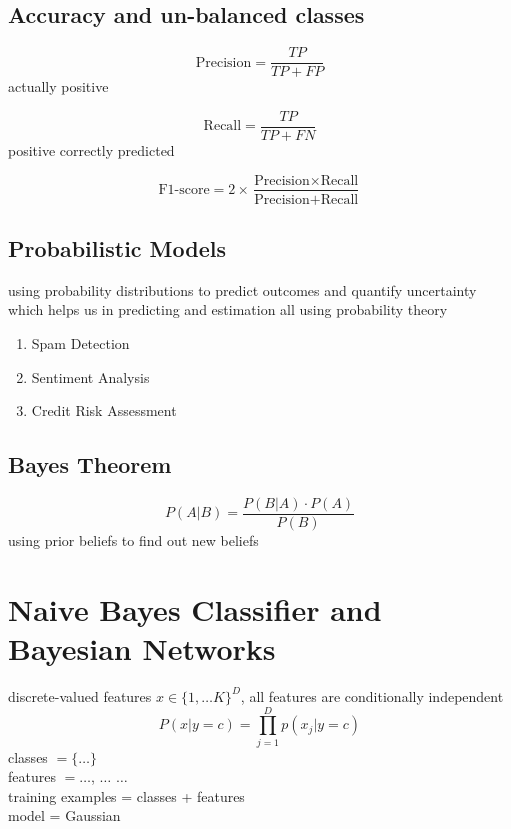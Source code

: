 \documentclass{article}
\begin{document}
\subsection*{Accuracy and un-balanced classes}
\begin{equation}
    \text{Precision} = \frac{TP}{TP + FP} 
\end{equation}
actually positive 

\begin{equation}
    \text{Recall} = \frac{TP}{TP + FN}
\end{equation}
positive correctly predicted

\begin{equation}
    \text{F1-score} = 2 \times \frac{\text{Precision} \times \text{Recall}}{\text{Precision} + \text{Recall}}
\end{equation}
\vspace{3mm}
\subsection*{Probabilistic Models}
using probability distributions to predict outcomes and quantify uncertainty which helps us in predicting and estimation all using probability theory

\begin{enumerate}
    \item Spam Detection
    \item Sentiment Analysis 
    \item Credit Risk Assessment 
\end{enumerate}

\subsection*{Bayes Theorem}
\begin{equation}
    P(A|B) = \frac{P(B|A) \cdot P(A)}{P(B)} 
\end{equation}
using prior beliefs to find out new beliefs
\newpage
\section{Naive Bayes Classifier and Bayesian Networks}
discrete-valued features $x \in {\{1,\dots K\}}^{D}$, 
all features are conditionally independent 
\begin{equation} 
    P(x | y = c) = \prod_{j=1}^{D} p (x_j | y = c)
\end{equation}
classes $ = \{\dots\}$ \\ 
features $= \dots$, $\dots$ $\dots$\\
training examples = classes + features \\
model = Gaussian 
\end{document}

